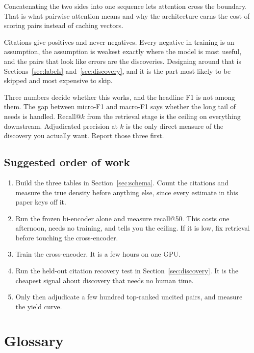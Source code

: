 \documentclass[11pt]{article}
\begin{document}
Concatenating the two sides into one sequence lets attention cross the boundary.
That is what pairwise attention means and why the architecture earns the cost of
scoring pairs instead of caching vectors.

Citations give positives and never negatives. Every negative in training is an
assumption, the assumption is weakest exactly where the model is most useful,
and the pairs that look like errors are the discoveries. Designing around that
is Sections~\ref{sec:labels} and~\ref{sec:discovery}, and it is the part most
likely to be skipped and most expensive to skip.

Three numbers decide whether this works, and the headline F1 is not among them.
The gap between micro-F1 and macro-F1 says whether the long tail of needs is
handled. Recall@$k$ from the retrieval stage is the ceiling on everything
downstream. Adjudicated precision at $k$ is the only direct measure of the
discovery you actually want. Report those three first.

\subsection*{Suggested order of work}

\begin{enumerate}
  \item Build the three tables in Section~\ref{sec:schema}. Count the citations
        and measure the true density before anything else, since every estimate
        in this paper keys off it.
  \item Run the frozen bi-encoder alone and measure recall@50. This costs one
        afternoon, needs no training, and tells you the ceiling. If it is low,
        fix retrieval before touching the cross-encoder.
  \item Train the cross-encoder. It is a few hours on one GPU.
  \item Run the held-out citation recovery test in Section~\ref{sec:discovery}.
        It is the cheapest signal about discovery that needs no human time.
  \item Only then adjudicate a few hundred top-ranked uncited pairs, and
        measure the yield curve.
\end{enumerate}

\newpage
\section*{Glossary}
\end{document}
